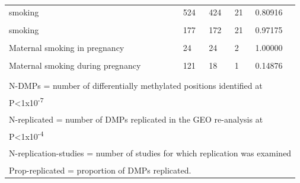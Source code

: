 \documentclass[11pt,oneside]{bristolthesis}
\begin{document}
\begin{table}
{\begin{tabular}[t]{lllll}
smoking & 524 & 424 & 21 & 0.80916\\
\cellcolor{gray!6}{smoking} & \cellcolor{gray!6}{192} & \cellcolor{gray!6}{0} & \cellcolor{gray!6}{21} & \cellcolor{gray!6}{0.00000}\\
smoking & 177 & 172 & 21 & 0.97175\\
\addlinespace
\cellcolor{gray!6}{Maternal smoking in pregnancy} & \cellcolor{gray!6}{19} & \cellcolor{gray!6}{19} & \cellcolor{gray!6}{2} & \cellcolor{gray!6}{1.00000}\\
Maternal smoking in pregnancy & 24 & 24 & 2 & 1.00000\\
\cellcolor{gray!6}{Maternal smoking in pregnancy} & \cellcolor{gray!6}{1,591} & \cellcolor{gray!6}{93} & \cellcolor{gray!6}{2} & \cellcolor{gray!6}{0.05845}\\
Maternal smoking during pregnancy & 121 & 18 & 1 & 0.14876\\
\cellcolor{gray!6}{Maternal smoking during pregnancy} & \cellcolor{gray!6}{4} & \cellcolor{gray!6}{4} & \cellcolor{gray!6}{1} & \cellcolor{gray!6}{1.00000}\\
\bottomrule
\multicolumn{5}{l}{\textsuperscript{} N-DMPs = number of differentially methylated positions identified at}\\
\multicolumn{5}{l}{P<1x10\textsuperscript{-7}}\\
\multicolumn{5}{l}{\textsuperscript{} N-replicated = number of DMPs replicated in the GEO re-analysis at}\\
\multicolumn{5}{l}{P<1x10\textsuperscript{-4}}\\
\multicolumn{5}{l}{\textsuperscript{} N-replication-studies = number of studies for which replication was examined}\\
\multicolumn{5}{l}{\textsuperscript{} Prop-replicated = proportion of DMPs replicated.}\\
\end{tabular}}
\end{table}
\end{document}
